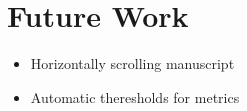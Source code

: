 \chapter{Future Work}\label{sec:future}

\begin{itemize}
  \item Horizontally scrolling manuscript
  \item Automatic theresholds for metrics
\end{itemize}

\clearpage
